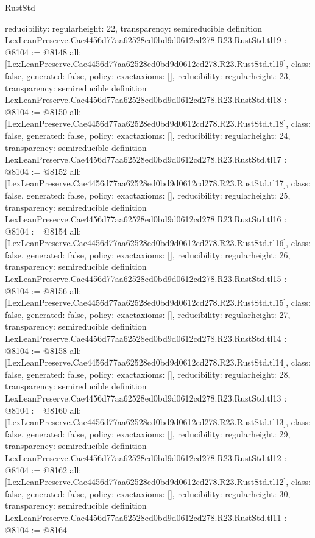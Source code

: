 \begin{lexlean}{RustStd}
\begin{coremodule}
{  reducibility: regular{height: 22},
  transparency: semireducible
}
definition LexLeanPreserve.Cae4456d77aa62528ed0bd9d0612cd278.R23.RustStd.tl19 : @8104 := @8148 {
  all: [LexLeanPreserve.Cae4456d77aa62528ed0bd9d0612cd278.R23.RustStd.tl19],
  class: false,
  generated: false,
  policy: exact{axioms: []},
  reducibility: regular{height: 23},
  transparency: semireducible
}
definition LexLeanPreserve.Cae4456d77aa62528ed0bd9d0612cd278.R23.RustStd.tl18 : @8104 := @8150 {
  all: [LexLeanPreserve.Cae4456d77aa62528ed0bd9d0612cd278.R23.RustStd.tl18],
  class: false,
  generated: false,
  policy: exact{axioms: []},
  reducibility: regular{height: 24},
  transparency: semireducible
}
definition LexLeanPreserve.Cae4456d77aa62528ed0bd9d0612cd278.R23.RustStd.tl17 : @8104 := @8152 {
  all: [LexLeanPreserve.Cae4456d77aa62528ed0bd9d0612cd278.R23.RustStd.tl17],
  class: false,
  generated: false,
  policy: exact{axioms: []},
  reducibility: regular{height: 25},
  transparency: semireducible
}
definition LexLeanPreserve.Cae4456d77aa62528ed0bd9d0612cd278.R23.RustStd.tl16 : @8104 := @8154 {
  all: [LexLeanPreserve.Cae4456d77aa62528ed0bd9d0612cd278.R23.RustStd.tl16],
  class: false,
  generated: false,
  policy: exact{axioms: []},
  reducibility: regular{height: 26},
  transparency: semireducible
}
definition LexLeanPreserve.Cae4456d77aa62528ed0bd9d0612cd278.R23.RustStd.tl15 : @8104 := @8156 {
  all: [LexLeanPreserve.Cae4456d77aa62528ed0bd9d0612cd278.R23.RustStd.tl15],
  class: false,
  generated: false,
  policy: exact{axioms: []},
  reducibility: regular{height: 27},
  transparency: semireducible
}
definition LexLeanPreserve.Cae4456d77aa62528ed0bd9d0612cd278.R23.RustStd.tl14 : @8104 := @8158 {
  all: [LexLeanPreserve.Cae4456d77aa62528ed0bd9d0612cd278.R23.RustStd.tl14],
  class: false,
  generated: false,
  policy: exact{axioms: []},
  reducibility: regular{height: 28},
  transparency: semireducible
}
definition LexLeanPreserve.Cae4456d77aa62528ed0bd9d0612cd278.R23.RustStd.tl13 : @8104 := @8160 {
  all: [LexLeanPreserve.Cae4456d77aa62528ed0bd9d0612cd278.R23.RustStd.tl13],
  class: false,
  generated: false,
  policy: exact{axioms: []},
  reducibility: regular{height: 29},
  transparency: semireducible
}
definition LexLeanPreserve.Cae4456d77aa62528ed0bd9d0612cd278.R23.RustStd.tl12 : @8104 := @8162 {
  all: [LexLeanPreserve.Cae4456d77aa62528ed0bd9d0612cd278.R23.RustStd.tl12],
  class: false,
  generated: false,
  policy: exact{axioms: []},
  reducibility: regular{height: 30},
  transparency: semireducible
}
definition LexLeanPreserve.Cae4456d77aa62528ed0bd9d0612cd278.R23.RustStd.tl11 : @8104 := @8164 {
}
\end{coremodule}
\end{lexlean}
